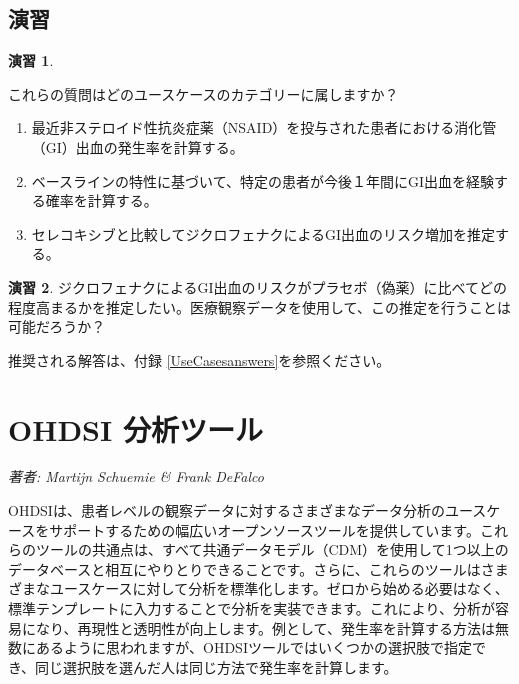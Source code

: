 \documentclass[
  11pt]{book}
\theoremstyle{definition}
\theoremstyle{definition}
\theoremstyle{definition}
\newtheorem{exercise}{演習}[chapter]
\theoremstyle{definition}
\theoremstyle{remark}
\begin{document}
\section{演習}\label{ux6f14ux7fd2-3}

\begin{exercise}
\protect\hypertarget{exr:exerciseUseCases1}{}\label{exr:exerciseUseCases1}

これらの質問はどのユースケースのカテゴリーに属しますか？

\begin{enumerate}
\def\labelenumi{\arabic{enumi}.}
\item
  最近非ステロイド性抗炎症薬（NSAID）を投与された患者における消化管（GI）出血の発生率を計算する。
\item
  ベースラインの特性に基づいて、特定の患者が今後１年間にGI出血を経験する確率を計算する。
\item
  セレコキシブと比較してジクロフェナクによるGI出血のリスク増加を推定する。
\end{enumerate}

\end{exercise}

\begin{exercise}
\protect\hypertarget{exr:exerciseUseCases2}{}\label{exr:exerciseUseCases2}ジクロフェナクによるGI出血のリスクがプラセボ（偽薬）に比べてどの程度高まるかを推定したい。医療観察データを使用して、この推定を行うことは可能だろうか？
\end{exercise}

推奨される解答は、付録 \ref{UseCasesanswers}を参照ください。

\chapter{OHDSI 分析ツール}\label{OhdsiAnalyticsTools}

\emph{著者: Martijn Schuemie \& Frank DeFalco}

OHDSIは、患者レベルの観察データに対するさまざまなデータ分析のユースケースをサポートするための幅広いオープンソースツールを提供しています。これらのツールの共通点は、すべて共通データモデル（CDM）を使用して1つ以上のデータベースと相互にやりとりできることです。さらに、これらのツールはさまざまなユースケースに対して分析を標準化します。ゼロから始める必要はなく、標準テンプレートに入力することで分析を実装できます。これにより、分析が容易になり、再現性と透明性が向上します。例として、発生率を計算する方法は無数にあるように思われますが、OHDSIツールではいくつかの選択肢で指定でき、同じ選択肢を選んだ人は同じ方法で発生率を計算します。
\end{document}
